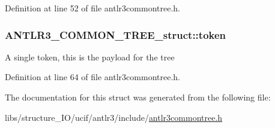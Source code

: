 Definition at line 52 of file antlr3commontree.\-h.

\hypertarget{struct_a_n_t_l_r3___c_o_m_m_o_n___t_r_e_e__struct_a0328c4ee838188d11da140a0fd47edfe}{
\subsubsection[{token}]{ A\-N\-T\-L\-R3\-\_\-\-C\-O\-M\-M\-O\-N\-\_\-\-T\-R\-E\-E\-\_\-struct\-::token}}\label{struct_a_n_t_l_r3___c_o_m_m_o_n___t_r_e_e__struct_a0328c4ee838188d11da140a0fd47edfe}
A single token, this is the payload for the tree 

Definition at line 64 of file antlr3commontree.\-h.



The documentation for this struct was generated from the following file\-:\begin{DoxyCompactItemize}
\item 
libs/structure\-\_\-\-I\-O/ucif/antlr3/include/\hyperlink{antlr3commontree_8h}{antlr3commontree.\-h}\end{DoxyCompactItemize}
